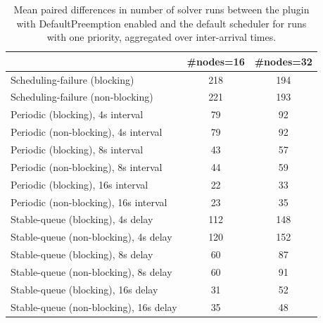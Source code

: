 \begin{table}[t]
\tiny
\setlength{\tabcolsep}{1.2pt}
\renewcommand{\arraystretch}{1.12}
\centering
\caption{Mean paired differences in number of solver runs between the plugin with DefaultPreemption enabled and the default scheduler for runs with one priority, aggregated over inter-arrival times.}
\label{tab:solver_runs-defpreempt1-prio1-std0-agg-arrival}
\begin{tabular}{l c c}
\toprule
 & \#nodes=16 & \#nodes=32 \\
\midrule
Scheduling-failure (blocking) & 218 & 194 \\
Scheduling-failure (non-blocking) & 221 & 193 \\
Periodic (blocking), 4s interval & 79 & 92 \\
Periodic (non-blocking), 4s interval & 79 & 92 \\
Periodic (blocking), 8s interval & 43 & 57 \\
Periodic (non-blocking), 8s interval & 44 & 59 \\
Periodic (blocking), 16s interval & 22 & 33 \\
Periodic (non-blocking), 16s interval & 23 & 35 \\
Stable-queue (blocking), 4s delay & 112 & 148 \\
Stable-queue (non-blocking), 4s delay & 120 & 152 \\
Stable-queue (blocking), 8s delay & 60 & 87 \\
Stable-queue (non-blocking), 8s delay & 60 & 91 \\
Stable-queue (blocking), 16s delay & 31 & 52 \\
Stable-queue (non-blocking), 16s delay & 35 & 48 \\
\bottomrule
\end{tabular}
\end{table}
